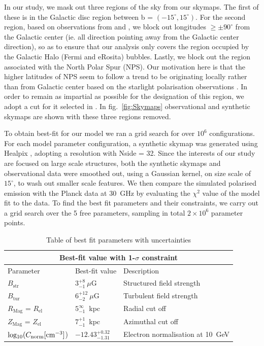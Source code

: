 \documentclass[usenatbib]{mnras}
\begin{document}
In our study, we mask out three regions of the sky from our skymaps. The first of these is in the Galactic disc region between b = $(-15^{\circ},15^{\circ})$. For the second region, based on observations from \cite{eROSITA} and \cite{Su_2010}, we block out longitudes  $\geq \pm 90^{\circ}$ from the Galactic center (ie. all direction pointing away from the Galactic center direction), so as to ensure that our analysis only covers the region occupied by the Galactic Halo (Fermi and eRosita) bubbles. Lastly, we block out the region associated with the North Polar Spur (NPS). Our motivation here is that the higher latitudes of NPS seem to follow a trend to be originating locally rather than from Galactic center based on the starlight polarisation observations \cite{Gina_2021}. In order to remain as impartial as possible for the designation of this region, we adopt a cut for it selected in \cite{Wolleben_2007}. In fig.~\ref{fig:Skymaps} observational and synthetic skymaps are shown with these three regions removed.


To obtain best-fit for our model we ran a grid search for over $10^{6}$ configurations. For each model parameter configuration, a synthetic skymap was generated using Healpix \cite{Healpix_2005}, adopting a resolution with Nside = 32. Since the interests of our study are focused on large scale structures, both the synthetic skymaps and observational data were smoothed out, using a Gaussian kernel, on size scale of $15^{\circ}$, to wash out smaller scale features. We then compare the simulated polarised emission with the Planck data at 30~GHz by evaluating the $\chi^{2}$ value of the model fit to the data. To find the best fit parameters and their constraints, we carry out a grid search over the 5 free parameters, sampling in total $2\times 10^{6}$ parameter points.

\begin{table}
\centering
\caption{Table of best fit parameters with uncertainties}
\begin{tabular}{ |p{}|p{4.5cm}|p{6.5cm}|  }
\hline
\multicolumn{3}{|c|}{Best-fit value with 1-$\sigma$ constraint} \\
\hline
\rule{0pt}{3ex}
Parameter & Best-fit value &Description \\
\hline
\hline
\rule{0pt}{3ex}
$B_{\mathrm{str}} $& $3_{-1}^{+8} ~ \mu$G & Structured field strength \\
\hline
\rule{0pt}{3ex}
$B_{\mathrm{tur}} $& $ 6_{-2}^{+12} ~\mu$G & Turbulent field strength\\
\hline
\rule{0pt}{3ex}
$R_{\mathrm{Mag}}$ = $R_{\mathrm{el}}$ & $5_{-1}^{\infty}$~kpc & Radial cut off \\
\hline
\rule{0pt}{3ex}
$Z_{\mathrm{Mag}}$ = $Z_{\mathrm{el}}$ & $7_{-1}^{+1}$~kpc & Azimuthal cut off\\
\hline
\rule{0pt}{3ex} 
${\rm{log_{10}}}(C_{\rm norm} [{\rm cm}^{-3}]$) & ${-12.43}_{{-1.31}}^{{+0.32}}$ & Electron normalisation at 10~GeV\\
\hline
\end{tabular}
\label{Para_table}
\end{table}
\end{document}
